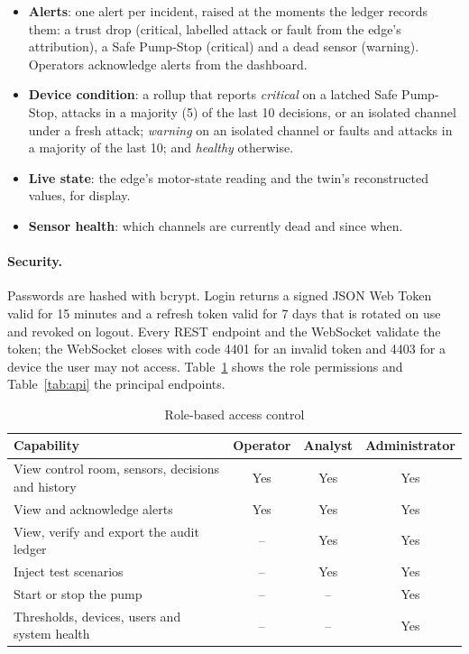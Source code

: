 \begin{itemize}
  \item \textbf{Alerts}: one alert per incident, raised at the moments the ledger records them: a trust drop (critical, labelled attack or fault from the edge's attribution), a Safe Pump-Stop (critical) and a dead sensor (warning). Operators acknowledge alerts from the dashboard.
  \item \textbf{Device condition}: a rollup that reports \emph{critical} on a latched Safe Pump-Stop, attacks in a majority (5) of the last 10 decisions, or an isolated channel under a fresh attack; \emph{warning} on an isolated channel or faults and attacks in a majority of the last 10; and \emph{healthy} otherwise.
  \item \textbf{Live state}: the edge's motor-state reading and the twin's reconstructed values, for display.
  \item \textbf{Sensor health}: which channels are currently dead and since when.
\end{itemize}

\paragraph{Security.} Passwords are hashed with bcrypt. Login returns a signed JSON Web Token valid for 15 minutes and a refresh token valid for 7 days that is rotated on use and revoked on logout. Every REST endpoint and the WebSocket validate the token; the WebSocket closes with code 4401 for an invalid token and 4403 for a device the user may not access. Table~\ref{tab:rbac} shows the role permissions and Table~\ref{tab:api} the principal endpoints.

\begin{table}[htbp]
\centering
\caption{Role-based access control}
\label{tab:rbac}
\small
\begin{tabularx}{\textwidth}{@{}X c c c@{}}
\toprule
\textbf{Capability} & \textbf{Operator} & \textbf{Analyst} & \textbf{Administrator} \\
\midrule
View control room, sensors, decisions and history & Yes & Yes & Yes \\
View and acknowledge alerts & Yes & Yes & Yes \\
View, verify and export the audit ledger & -- & Yes & Yes \\
Inject test scenarios & -- & Yes & Yes \\
Start or stop the pump & -- & -- & Yes \\
Thresholds, devices, users and system health & -- & -- & Yes \\
\bottomrule
\end{tabularx}
\end{table}

